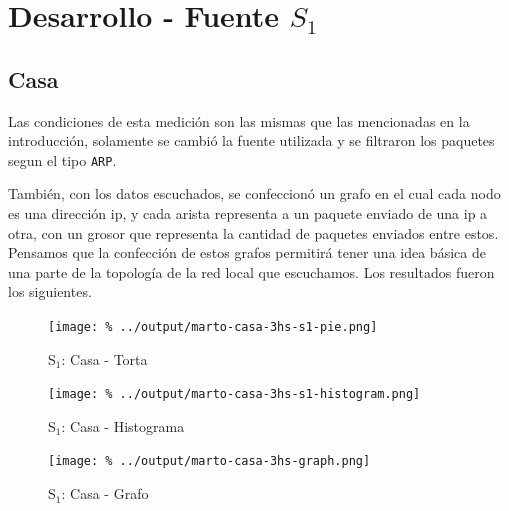 \documentclass[final,inline,a4paper,narroweqnarray]{ieee}
\let\Oldsection\section
\renewcommand{\section}{\FloatBarrier\Oldsection}
\let\Oldsubsection\subsection
\renewcommand{\subsection}{\FloatBarrier\Oldsubsection}
\begin{document}
\section{Desarrollo - Fuente $S_1$}
  \subsection{Casa}

  Las condiciones de esta medición son las mismas que las mencionadas
  en la introducción, solamente se cambió la fuente utilizada y se
  filtraron los paquetes segun el tipo \texttt{ARP}.

  También, con los datos escuchados, se confeccionó un grafo en el
  cual cada nodo es una dirección ip, y cada arista representa a un
  paquete enviado de una ip a otra, con un grosor que representa la
  cantidad de paquetes enviados entre estos. Pensamos que la
  confección de estos grafos permitirá tener una idea básica de una
  parte de la topología de la red local que escuchamos. Los resultados
  fueron los siguientes.

    \begin{figure}[ht]\begin{center}
      \texttt{[image: \%
      ../output/marto-casa-3hs-s1-pie.png]}
      \vspace{-2em}
      \caption{S$_1$: Casa - Torta}
      \label{marto-casa-3hs-s1-pie}
    \end{center}\end{figure}

    \begin{figure}[ht]\begin{center}
      \texttt{[image: \%
      ../output/marto-casa-3hs-s1-histogram.png]}
      \vspace{-2em}
      \caption{S$_1$: Casa - Histograma}
      \label{marto-casa-3hs-s1-histogram}
    \end{center}\end{figure}

    \begin{figure}[ht]\begin{center}
      \texttt{[image: \%
      ../output/marto-casa-3hs-graph.png]}
      \vspace{-2em}
      \caption{S$_1$: Casa - Grafo}
      \label{marto-casa-3hs-graph}
    \end{center}\end{figure}
\end{document}
